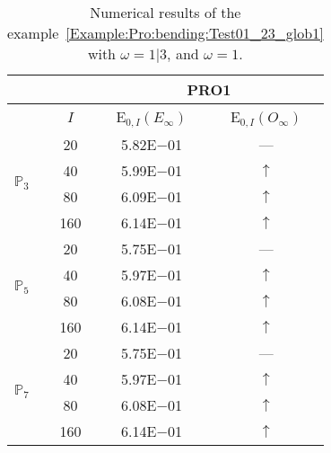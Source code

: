 \begin{table}[H]
\caption{Numerical results of the example~\ref{Example:Pro:bending:Test01_23_glob1} with $\omega=1|3$, and $\omega=1$.}
\setlength{\tabcolsep}{5pt}
\centering
\begin{tabular}{@{}l c c c@{}}
\toprule
 &  & \multicolumn{2}{c}{PRO1}\\
\midrule
 & $I$ & E$_{0,I}(E_{\infty})$ & E$_{0,I}(O_{\infty})$\\
\midrule
\multirow{4}{*}{$\mathbb{P}_{3}$} & 20 & 5.82E$-$01 & ---\\
 & 40 & 5.99E$-$01 & $\uparrow$\\
 & 80 & 6.09E$-$01 & $\uparrow$\\
 & 160 & 6.14E$-$01 & $\uparrow$\\
\midrule
\multirow{4}{*}{$\mathbb{P}_{5}$} & 20 & 5.75E$-$01 & ---\\
 & 40 & 5.97E$-$01 & $\uparrow$\\
 & 80 & 6.08E$-$01 & $\uparrow$\\
 & 160 & 6.14E$-$01 & $\uparrow$\\
\midrule
\multirow{4}{*}{$\mathbb{P}_{7}$} & 20 & 5.75E$-$01 & ---\\
 & 40 & 5.97E$-$01 & $\uparrow$\\
 & 80 & 6.08E$-$01 & $\uparrow$\\
 & 160 & 6.14E$-$01 & $\uparrow$\\
\bottomrule
\end{tabular}
\label{Table:PRO:test_01_23_test2}
\end{table}
